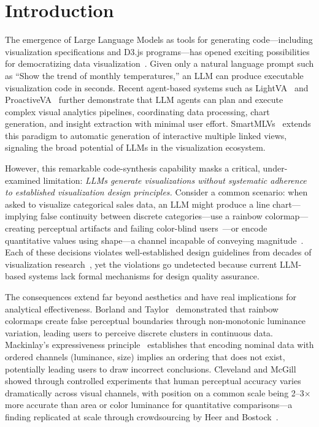 \documentclass[final,5p,times,twocolumn]{elsarticle}
\begin{document}
\linenumbers

\section{Introduction}
\label{sec:intro}

The emergence of Large Language Models as tools for generating code---including visualization specifications and D3.js programs---has opened exciting possibilities for democratizing data visualization~\cite{dibia2023lida,li2024lightva,zhao2025proactiveva}. Given only a natural language prompt such as ``Show the trend of monthly temperatures,'' an LLM can produce executable visualization code in seconds. Recent agent-based systems such as LightVA~\cite{li2024lightva} and ProactiveVA~\cite{zhao2025proactiveva} further demonstrate that LLM agents can plan and execute complex visual analytics pipelines, coordinating data processing, chart generation, and insight extraction with minimal user effort. SmartMLVs~\cite{shu2025smartmlvs} extends this paradigm to automatic generation of interactive multiple linked views, signaling the broad potential of LLMs in the visualization ecosystem.

However, this remarkable code-synthesis capability masks a critical, under-examined limitation: \textit{LLMs generate visualizations without systematic adherence to established visualization design principles.} Consider a common scenario: when asked to visualize categorical sales data, an LLM might produce a line chart---implying false continuity between discrete categories---use a rainbow colormap---creating perceptual artifacts and failing color-blind users~\cite{borland2007rainbow}---or encode quantitative values using shape---a channel incapable of conveying magnitude~\cite{stevens1946theory}. Each of these decisions violates well-established design guidelines from decades of visualization research~\cite{cleveland1984graphical,mackinlay1986automating,munzner2014visualization}, yet the violations go undetected because current LLM-based systems lack formal mechanisms for design quality assurance.

The consequences extend far beyond aesthetics and have real implications for analytical effectiveness. Borland and Taylor~\cite{borland2007rainbow} demonstrated that rainbow colormaps create false perceptual boundaries through non-monotonic luminance variation, leading users to perceive discrete clusters in continuous data. Mackinlay's expressiveness principle~\cite{mackinlay1986automating} establishes that encoding nominal data with ordered channels (luminance, size) implies an ordering that does not exist, potentially leading users to draw incorrect conclusions. Cleveland and McGill~\cite{cleveland1984graphical} showed through controlled experiments that human perceptual accuracy varies dramatically across visual channels, with position on a common scale being 2--3$\times$ more accurate than area or color luminance for quantitative comparisons---a finding replicated at scale through crowdsourcing by Heer and Bostock~\cite{heer2010crowdsourcing}.
\end{document}
